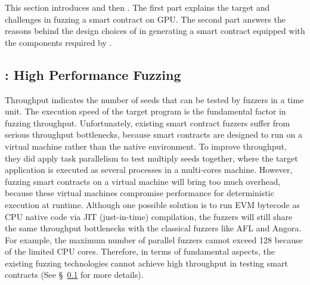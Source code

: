 This section introduces {\runner} and then {\translator}.
The first part explains the target and challenges in fuzzing a smart contract on GPU.
The second part answers the reasons behind the design choices of {\translator} in generating a smart contract equipped with the components required by {\runner}.


\subsection{{\runner}: High Performance Fuzzing}
Throughput indicates the number of seeds that can be tested by fuzzers in a time unit. The execution speed of the target program is the fundamental factor in fuzzing throughput\cite{fuzzan_atc}. 
%
Unfortunately, existing smart contract fuzzers\cite{confuzzius_eurosp,echidna_issta} suffer from serious throughput bottlenecks, because smart contracts are designed to run on a virtual machine rather than the native environment. 
%
To improve throughput, they did apply task parallelism to test multiply seeds together, where the target application is executed as several processes in a multi-cores machine.
However, fuzzing smart contracts on a virtual machine will bring too much overhead, because these virtual machines compromise performance for
deterministic execution at runtime.
%
Although one possible solution is to run EVM bytecode as CPU native code via JIT (just-in-time) compilation, the fuzzers will still share the same throughput bottlenecks with the classical fuzzers like AFL\cite{afl} and Angora\cite{angora_sp}. 
For example, the maximum number of parallel fuzzers cannot exceed 128 because of the limited CPU cores.
Therefore, in terms of fundamental aspects, the existing fuzzing technologies cannot achieve high throughput in testing smart contracts (See \S~\ref{} for more details).


